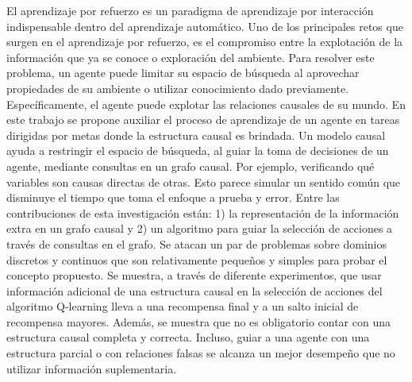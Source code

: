 
\begin{resumen}


El aprendizaje por refuerzo es un paradigma de aprendizaje por interacción indispensable dentro del aprendizaje automático. Uno de los principales retos que surgen en 
el aprendizaje por refuerzo, es el compromiso entre la 
explotación de la información que ya se conoce o 
exploración del ambiente. Para resolver este problema, 
un agente puede limitar su espacio de búsqueda al 
aprovechar propiedades de su ambiente o utilizar 
conocimiento dado previamente. Específicamente, el agente
puede explotar las relaciones causales de su mundo. En este
trabajo se propone auxiliar el proceso de aprendizaje de
un agente en tareas dirigidas por metas donde la estructura
causal es brindada. 
Un modelo causal ayuda a restringir el espacio de búsqueda, al
guiar la toma de decisiones de un agente, mediante consultas en un grafo causal. Por ejemplo, verificando qué variables 
son causas directas de otras.
Esto parece simular un sentido común que disminuye el
tiempo que toma el enfoque a prueba y error.
Entre las contribuciones de esta investigación están: 1)
la representación de la información extra en un grafo causal y 2) un algoritmo para guiar la selección de acciones 
a través de consultas en el grafo.
Se atacan un par de problemas sobre dominios discretos y continuos que son relativamente pequeños y simples para
probar el concepto propuesto.
Se muestra, a través de diferente experimentos, que
usar información adicional de una estructura causal
en la selección de acciones del algoritmo Q-learning
lleva a una recompensa final y a un salto inicial de
recompensa mayores. Además, se muestra que 
no es obligatorio contar con una estructura causal 
completa y correcta. Incluso, guiar a una agente con una estructura parcial o con relaciones falsas se alcanza un mejor desempeño que no utilizar información suplementaria.

\end{resumen}